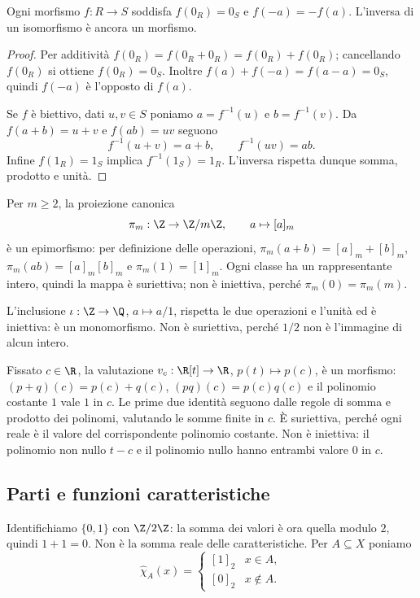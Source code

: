 \begin{proposizione}\label{prop:morfismi-zero}
Ogni morfismo $f:R\to S$ soddisfa $f(0_R)=0_S$ e $f(-a)=-f(a)$. L'inversa di un isomorfismo è ancora un morfismo.
\end{proposizione}
\begin{proof}
Per additività $f(0_R)=f(0_R+0_R)=f(0_R)+f(0_R)$; cancellando $f(0_R)$ si ottiene $f(0_R)=0_S$. Inoltre $f(a)+f(-a)=f(a-a)=0_S$, quindi $f(-a)$ è l'opposto di $f(a)$.

Se $f$ è biettivo, dati $u,v\in S$ poniamo $a=f^{-1}(u)$ e $b=f^{-1}(v)$. Da $f(a+b)=u+v$ e $f(ab)=uv$ seguono
\[
f^{-1}(u+v)=a+b,\qquad f^{-1}(uv)=ab.
\]
Infine $f(1_R)=1_S$ implica $f^{-1}(1_S)=1_R$. L'inversa rispetta dunque somma, prodotto e unità.
\end{proof}

\begin{esempio}
Per $m\ge2$, la proiezione canonica
\[
\pi_m:\Z\to\Z/m\Z,\qquad a\mapsto[a]_m
\]
è un epimorfismo: per definizione delle operazioni, $\pi_m(a+b)=[a]_m+[b]_m$, $\pi_m(ab)=[a]_m[b]_m$ e $\pi_m(1)=[1]_m$. Ogni classe ha un rappresentante intero, quindi la mappa è suriettiva; non è iniettiva, perché $\pi_m(0)=\pi_m(m)$.

L'inclusione $\iota:\Z\to\Q$, $a\mapsto a/1$, rispetta le due operazioni e l'unità ed è iniettiva: è un monomorfismo. Non è suriettiva, perché $1/2$ non è l'immagine di alcun intero.
\end{esempio}

\begin{esempio}[Valutazione di polinomi]
Fissato $c\in\R$, la valutazione $v_c:\R[t]\to\R$, $p(t)\mapsto p(c)$, è un morfismo: $(p+q)(c)=p(c)+q(c)$, $(pq)(c)=p(c)q(c)$ e il polinomio costante $1$ vale $1$ in $c$. Le prime due identità seguono dalle regole di somma e prodotto dei polinomi, valutando le somme finite in $c$. È suriettiva, perché ogni reale è il valore del corrispondente polinomio costante. Non è iniettiva: il polinomio non nullo $t-c$ e il polinomio nullo hanno entrambi valore $0$ in $c$.
\end{esempio}

\subsection{Parti e funzioni caratteristiche}
Identifichiamo $\{0,1\}$ con $\Z/2\Z$: la somma dei valori è ora quella modulo $2$, quindi $1+1=0$. Non è la somma reale delle caratteristiche. Per $A\subseteq X$ poniamo
\[
\widehat\chi_A(x)=\begin{cases}[1]_2&x\in A,\\{}[0]_2&x\notin A.\end{cases}
\]

